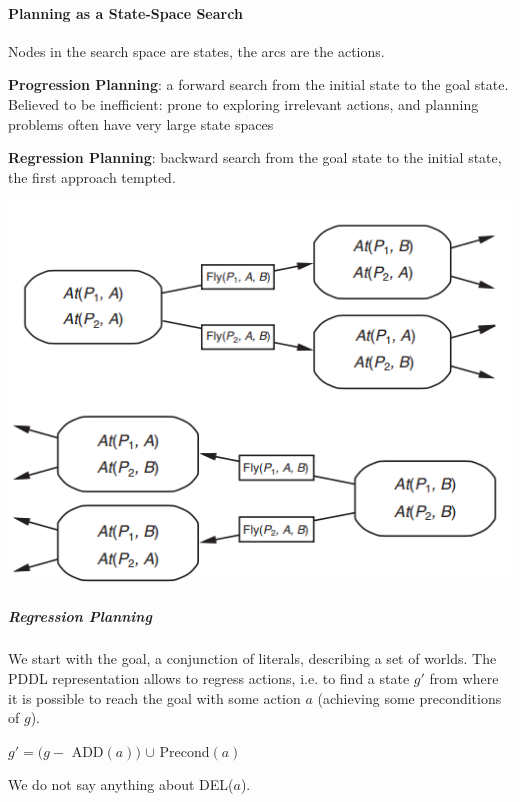 \documentclass[10pt]{report}
\begin{document}
\paragraph{Planning as a State-Space Search}
Nodes in the search space are states, the arcs are the actions.
\begin{multicols}{2}
\begin{list}{}{}
	\item \textbf{Progression Planning}: a forward search from the initial state to the goal state. Believed to be inefficient: prone to exploring irrelevant actions, and planning problems often have very large state spaces
	\item \textbf{Regression Planning}: backward search from the goal state to the initial state, the first approach tempted.
\end{list}
\columnbreak
\begin{center}
	\includegraphics[scale=0.5]{24.png}
\end{center}
\end{multicols}
\subparagraph{Regression Planning} We start with the goal, a conjunction of literals, describing a set of worlds. The PDDL representation allows to regress actions, i.e. to find a state $g'$ from where it is possible to reach the goal with some action $a$ (achieving some preconditions of $g$).\begin{list}{}{}
	\item $g' = (g -$ ADD$(a))$ $\cup$ Precond$(a)$
\end{list}
We do not say anything about DEL($a$).
\end{document}
